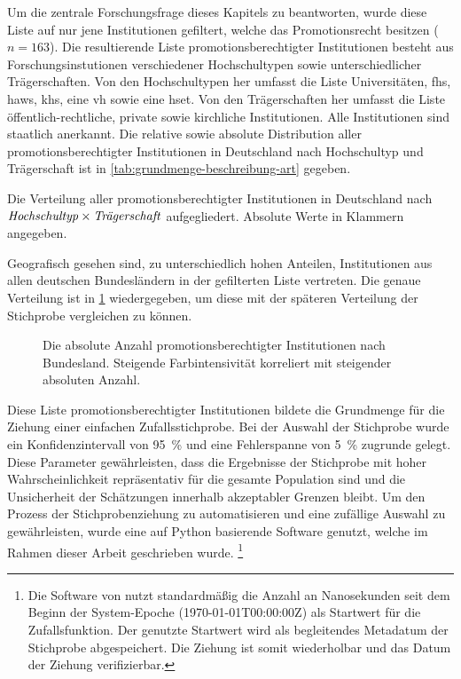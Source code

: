 Um die zentrale Forschungsfrage dieses Kapitels zu beantworten, wurde diese Liste auf nur jene Institutionen gefiltert, welche das Promotionsrecht besitzen ($n=163$).
Die resultierende Liste promotionsberechtigter Institutionen besteht aus Forschungsinstutionen verschiedener Hochschultypen sowie unterschiedlicher Trägerschaften.
Von den Hochschultypen her umfasst die Liste Universitäten, \glspl{fh}, \glspl{haw}, \glspl{kh}, eine \gls{vh} sowie eine \gls{hset}.
Von den Trägerschaften her umfasst die Liste öffentlich-rechtliche, private sowie kirchliche Institutionen. Alle Institutionen sind staatlich anerkannt.
Die relative sowie absolute Distribution aller promotionsberechtigter Institutionen in Deutschland nach Hochschultyp und Trägerschaft ist in \cref{tab:grundmenge-beschreibung-art} gegeben.
\begin{table}[!htbp]
	\caption{Die Verteilung aller promotionsberechtigter Institutionen in Deutschland nach $\text{\textit{Hochschultyp}}\times\text{\textit{Trägerschaft}}$ aufgegliedert. Absolute Werte in Klammern angegeben.}
    
	\label{tab:grundmenge-beschreibung-art}
\end{table}

\noindent Geografisch gesehen sind, zu unterschiedlich hohen Anteilen, Institutionen aus allen deutschen Bundesländern in der gefilterten Liste vertreten.
Die genaue Verteilung ist in \cref{fig:DE-grundmenge-beschreibung} wiedergegeben, um diese mit der späteren Verteilung der Stichprobe vergleichen zu können.
\begin{figure}[!htbp]
    \centering
    
    \caption{Die absolute Anzahl promotionsberechtigter Institutionen nach Bundesland.
    Steigende Farbintensivität korreliert mit steigender absoluten Anzahl.}
    \label{fig:DE-grundmenge-beschreibung}
\end{figure}


Diese Liste promotionsberechtigter Institutionen bildete die Grundmenge für die Ziehung einer einfachen Zufallsstichprobe.
Bei der Auswahl der Stichprobe wurde ein Konfidenzintervall von \SI{95}{\percent} und eine Fehlerspanne von \SI{5}{\percent} zugrunde gelegt.
Diese Parameter gewährleisten, dass die Ergebnisse der Stichprobe mit hoher Wahrscheinlichkeit repräsentativ für die gesamte Population sind und die Unsicherheit der Schätzungen innerhalb akzeptabler Grenzen bleibt.
Um den Prozess der Stichprobenziehung zu automatisieren und eine zufällige Auswahl zu gewährleisten, wurde eine auf Python basierende Software \autocite{Krassnig2024-csv} genutzt, welche im Rahmen dieser Arbeit geschrieben wurde.%
\footnote{%
Die Software von \citeauthor{Krassnig2024-csv} \autocite{Krassnig2024-csv} nutzt standardmäßig die Anzahl an Nanosekunden seit dem Beginn der System-Epoche (1970-01-01T00:00:00Z) als Startwert für die Zufallsfunktion.
Der genutzte Startwert wird als begleitendes Metadatum der Stichprobe abgespeichert.
Die Ziehung ist somit wiederholbar und das Datum der Ziehung verifizierbar.} 

